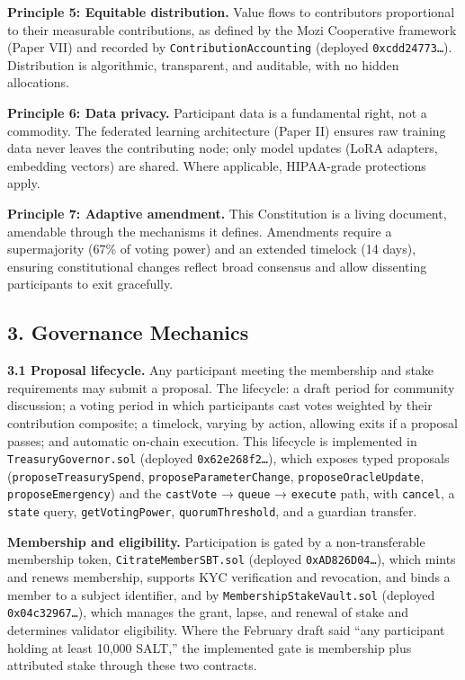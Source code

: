 \textbf{Principle 5: Equitable distribution.} Value flows to
contributors proportional to their measurable contributions, as defined
by the Mozi Cooperative framework (Paper VII) and recorded by
\texttt{ContributionAccounting} (deployed \texttt{0xcdd24773…}).
Distribution is algorithmic, transparent, and auditable, with no hidden
allocations.

\textbf{Principle 6: Data privacy.} Participant data is a fundamental
right, not a commodity. The federated learning architecture (Paper II)
ensures raw training data never leaves the contributing node; only model
updates (LoRA adapters, embedding vectors) are shared. Where applicable,
HIPAA-grade protections apply.

\textbf{Principle 7: Adaptive amendment.} This Constitution is a living
document, amendable through the mechanisms it defines. Amendments
require a supermajority (67\% of voting power) and an extended timelock
(14 days), ensuring constitutional changes reflect broad consensus and
allow dissenting participants to exit gracefully.

\subsection{3. Governance Mechanics}\label{governance-mechanics}

\textbf{3.1 Proposal lifecycle.} Any participant meeting the membership
and stake requirements may submit a proposal. The lifecycle: a draft
period for community discussion; a voting period in which participants
cast votes weighted by their contribution composite; a timelock, varying
by action, allowing exits if a proposal passes; and automatic on-chain
execution. This lifecycle is implemented in
\texttt{TreasuryGovernor.sol} (deployed \texttt{0x62e268f2…}), which
exposes typed proposals (\texttt{proposeTreasurySpend},
\texttt{proposeParameterChange}, \texttt{proposeOracleUpdate},
\texttt{proposeEmergency}) and the \texttt{castVote} → \texttt{queue} →
\texttt{execute} path, with \texttt{cancel}, a \texttt{state} query,
\texttt{getVotingPower}, \texttt{quorumThreshold}, and a guardian
transfer.

\textbf{Membership and eligibility.} Participation is gated by a
non-transferable membership token, \texttt{CitrateMemberSBT.sol}
(deployed \texttt{0xAD826D04…}), which mints and renews membership,
supports KYC verification and revocation, and binds a member to a
subject identifier, and by \texttt{MembershipStakeVault.sol} (deployed
\texttt{0x04c32967…}), which manages the grant, lapse, and renewal of
stake and determines validator eligibility. Where the February draft
said ``any participant holding at least 10,000 SALT,'' the implemented
gate is membership plus attributed stake through these two contracts.

